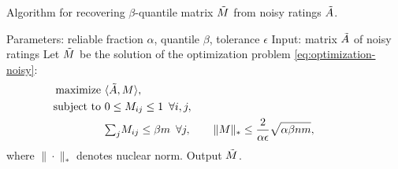 \begin{algorithm}[b!]
\caption{Algorithm for recovering $\beta$-quantile matrix $\tilde{M}$ from 
noisy ratings $\tilde{A}$.}
\label{alg:recover-M}
\begin{algorithmic}[1]
\State Parameters: reliable fraction $\alpha$, quantile $\beta$, tolerance $\epsilon$
\State Input: matrix $\tilde{A}$ of noisy ratings
\State Let $\tilde{M}$ be the solution of the optimization problem \eqref{eq:optimization-noisy}:
  \begin{align}
  \label{eq:optimization-noisy}
  \text{maximize } &\langle \tilde{A}, M \rangle, \\
  \notag \text{ subject to } &0 \leq M_{ij} \leq 1 \,\,\, \forall i,j, \\
  \notag                     &{\textstyle \sum_{j}} M_{ij} \leq \beta m \,\,\, \forall j, \quad\quad
                      \|M\|_* \leq \frac{2}{\alpha\epsilon}\sqrt{\alpha\beta nm}, \phantom{xxxxxxx}
  \end{align}
  where $\|\cdot\|_*$ denotes nuclear norm.
\State Output $\tilde{M}$.
\end{algorithmic}
\end{algorithm}
